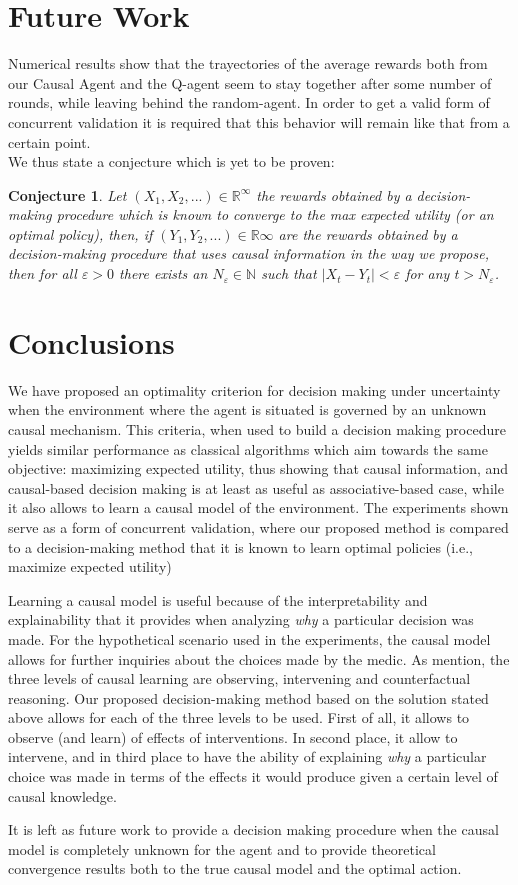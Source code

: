 \documentclass[letterpaper]{article} %
\theoremstyle{plain}
\newtheorem{conj}{Conjecture}
\begin{document}
\section{Future Work}
Numerical results show that the trayectories of the average rewards both from our Causal Agent and the Q-agent seem to stay together after some number of rounds, while leaving behind the random-agent. In order to get a valid form of concurrent validation it is required that this behavior will remain like that from a certain point. \\
We thus state a conjecture which is yet to be proven:
\begin{conj}
Let $(X_1,X_2,...) \in \mathbb{R}^\infty$ the rewards obtained by a decision-making procedure which is known to converge to the max expected utility (or an optimal policy), then, if $(Y_1, Y_2,...) \in \mathbb{R}\infty$ are the rewards obtained by a decision-making procedure that uses causal information in the way we propose, then for all $\varepsilon > 0$ there exists an $N_\varepsilon \in \mathbb{N}$ such that $ | X_t - Y_t | < \varepsilon$ for any $t > N_\varepsilon$. 
\end{conj}

\section{Conclusions}
We have proposed an optimality criterion for decision making under uncertainty when the environment where the agent is situated is governed by an unknown causal mechanism. This criteria, when used to build a decision making procedure yields similar performance as classical algorithms which aim towards the same objective: maximizing expected utility, thus showing that causal information, and causal-based decision making is at least as useful as associative-based case, while it also allows to learn a causal model of the environment. The experiments shown serve as a form of concurrent validation, where our proposed method is compared to a decision-making method that it is known to learn optimal policies (i.e., maximize expected utility)

Learning a causal model is useful because of the interpretability and explainability that it provides when analyzing \textit{why} a particular decision was made. For the hypothetical scenario used in the experiments, the causal model allows for further inquiries about the choices made by the medic. As \cite{pearl2018why} mention, the three levels of causal learning are observing, intervening and counterfactual reasoning. Our proposed decision-making method based on the solution stated above allows for each of the three levels to be used. First of all, it allows to observe (and learn) of effects of interventions. In second place, it allow to intervene, and in third place to have the ability of explaining \textit{why} a particular choice was made in terms of the effects it would produce given a certain level of causal knowledge.

It is left as future work to provide a decision making procedure when the causal model is completely unknown for the agent and to provide theoretical convergence results both to the true causal model and the optimal action.


\end{document}
